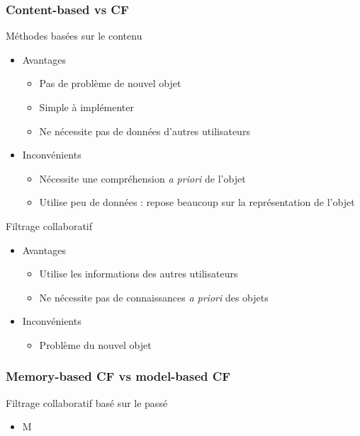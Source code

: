\documentclass[11pt,sans]{beamer}
\begin{document}
    \begin{frame}
        \frametitle{Content-based vs CF}

        M\'ethodes bas\'ees sur le contenu
        \begin{itemize}
            \item Avantages
                \begin{itemize}
                    \item Pas de problème de nouvel objet
                    \item Simple à impl\'ementer
                    \item Ne n\'ecessite pas de donn\'ees d'autres utilisateurs
                \end{itemize}
            \item Inconv\'enients
                \begin{itemize}
                    \item N\'ecessite une compr\'ehension \emph{a priori} de
                        l'objet
                    \item Utilise peu de donn\'ees : repose beaucoup sur la
                        repr\'esentation de l'objet
                \end{itemize}
        \end{itemize}

        Filtrage collaboratif
        \begin{itemize}
            \item Avantages
                \begin{itemize}
                    \item Utilise les informations des autres utilisateurs
                    \item Ne n\'ecessite pas de connaissances \emph{a priori}
                        des objets
                \end{itemize}
            \item Inconv\'enients
                \begin{itemize}
                    \item Problème du nouvel objet
                \end{itemize}
        \end{itemize}
    \end{frame}

    \begin{frame}[<+->]
        \frametitle{Memory-based CF vs model-based CF}

        Filtrage collaboratif bas\'e sur le pass\'e
        \begin{itemize}
            \item M
        \end{itemize}
    \end{frame}
\end{document}
